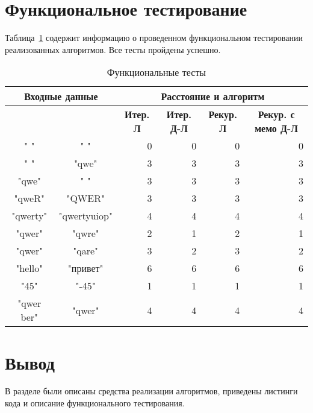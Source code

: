 \clearpage

\section{Функциональное тестирование}

Таблица~\ref{tbl:test} содержит информацию о проведенном функциональном тестировании реализованных алгоритмов. Все тесты пройдены успешно. 

\begin{table}[ht]
	\small
	\begin{center}
			\caption{Функциональные тесты}
			\label{tbl:test}
			\begin{tabular}{|c|c|r|r|r|r|}
				\hline
				\multicolumn{2}{|c|}{\bfseries Входные данные}
				& \multicolumn{4}{c|}{\bfseries Расстояние и алгоритм} \\ 
				\hline 
				&
				& \multicolumn{1}{c|}{\bfseries Итер. Л} 
				& \multicolumn{1}{c|}{\bfseries Итер. Д-Л} 
				& \multicolumn{1}{c|}{\bfseries Рекур. Л} 
				& \multicolumn{1}{c|}{\bfseries Рекур. с мемо Д-Л} \\
				\hline
				" " & " " & 0 & 0 & 0 & 0 \\
				\hline
				" " & "qwe" & 3 & 3 & 3 & 3 \\
    			\hline
				"qwe" & " " & 3 & 3 & 3 & 3 \\
    			\hline
				"qweR" & "QWER" & 3 & 3 & 3 & 3 \\
    			\hline
				"qwerty" & "qwertyuiop" & 4 & 4 & 4 & 4 \\
    			\hline
				"qwer" & "qwre" & 2 & 1 & 2 & 1 \\
    			\hline
				"qwer" & "qare" & 3 & 2 & 3 & 2 \\
    			\hline
				"hello" & "привет" & 6 & 6 & 6 & 6 \\
    			\hline
				"45" & "-45" & 1 & 1 & 1 & 1 \\
    			\hline
				"qwer ber" & "qwer" & 4 & 4 & 4 & 4 \\
    			\hline
			\end{tabular}	
	\end{center}
\end{table}

\section*{Вывод}

В разделе были описаны средства реализации алгоритмов, приведены листинги кода и описание функционального тестирования.
